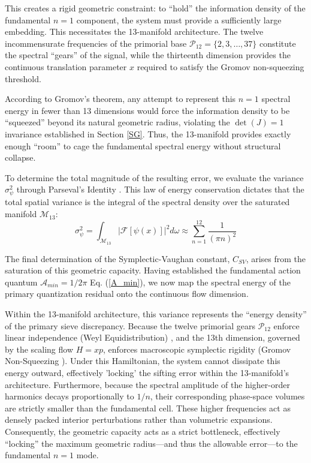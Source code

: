 \documentclass[sn-mathphys-num, pdflatex, referee]{sn-jnl}
\begin{document}
This creates a rigid geometric constraint: to ``hold'' the information density of the fundamental $n=1$ component, the system must provide a sufficiently large embedding. This necessitates the 13-manifold architecture. The twelve incommensurate frequencies of the primorial base $\mathcal{P}_{12} = \{2, 3, \dots, 37\}$ constitute the spectral ``gears'' of the signal, while the thirteenth dimension provides the continuous translation parameter $x$ required to satisfy the Gromov non-squeezing threshold. 

According to Gromov's theorem, any attempt to represent this $n=1$ spectral energy in fewer than 13 dimensions would force the information density to be ``squeezed'' beyond its natural geometric radius, violating the $\det(J)=1$ invariance established in Section \ref{SG}. Thus, the 13-manifold provides exactly enough ``room'' to cage the fundamental spectral energy without structural collapse. 

 To determine the total magnitude of the resulting error, we evaluate the variance $\sigma_{\psi}^2$ through Parseval's Identity \cite{stein2003fourier}. This law of energy conservation dictates that the total spatial variance is the integral of the spectral density over the saturated manifold $\mathcal{M}_{13}$:
\begin{equation}
\sigma_{\psi}^2 = \int_{\mathcal{M}_{13}} \left| \mathcal{F}[\psi(x)] \right|^2 d\omega \approx \sum_{n=1}^{12} \frac{1}{(\pi n)^2} 
\end{equation}

The final determination of the Symplectic-Vaughan constant, $C_{SV}$, arises from the saturation of this geometric capacity. Having established the fundamental action quantum $\mathcal{A}_{min} = 1/2\pi$ Eq. (\ref{A_min}), we now map the spectral energy of the primary quantization residual onto the continuous flow dimension.

Within the 13-manifold architecture, this variance represents the ``energy density'' of the primary sieve discrepancy. Because the twelve primorial gears $\mathcal{P}_{12}$ enforce linear independence (Weyl Equidistribution) \cite{weyl}, and the 13th dimension, governed by the scaling flow $H=xp$, enforces macroscopic symplectic rigidity (Gromov Non-Squeezing \cite{gromov}). Under this Hamiltonian, the system cannot dissipate this energy outward, effectively 'locking' the sifting error within the 13-manifold's architecture. Furthermore, because the spectral amplitude of the higher-order harmonics decays proportionally to $1/n$, their corresponding phase-space volumes are strictly smaller than the fundamental cell. These higher frequencies act as densely packed interior perturbations rather than volumetric expansions. Consequently, the geometric capacity acts as a strict bottleneck, effectively ``locking'' the maximum geometric radius---and thus the allowable error---to the fundamental $n=1$ mode.
\end{document}
